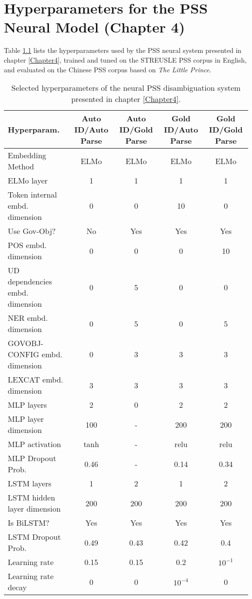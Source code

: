 
\chapter{Hyperparameters for the PSS Neural Model (Chapter 4)} %

\label{AppendixC} %

Table \ref{tab:hyperparamsC} lists the hyperparameters used by the
PSS neural system presented in chapter \ref{Chapter4}, trained and tuned on the STREUSLE PSS corpus in English, and evaluated on the Chinese PSS corpus based on \textit{The Little Prince}.

\begin{table}[]
  \small
	\centering
	\begin{tabular}{@{}l|cccc@{}}
		\toprule
		Hyperparam. & Auto ID/Auto Parse & Auto ID/Gold Parse & Gold ID/Auto Parse & Gold ID/Gold Parse\\
		\midrule
        Embedding Method & ELMo & ELMo & ELMo & ELMo \\
        ELMo layer & 1 & 1 & 1 & 1 \\
        Token internal embd. dimension & 0 & 0 & 10 & 0 \\
        Use Gov-Obj? & No & Yes & Yes & Yes \\
        POS embd. dimension  & 0 & 0 & 0 & 10 \\
        UD dependencies embd. dimension  & 0 & 5 & 0 & 0 \\
        NER  embd. dimension  & 0 & 5 & 0 & 5 \\
        GOVOBJ-CONFIG embd. dimension  & 0 & 3 & 3 & 3 \\
        LEXCAT embd. dimension  & 3 & 3 & 3 & 3 \\
        MLP layers  & 2 & 0 & 2 & 2 \\
        MLP layer dimension  & 100 & - & 200 & 200 \\
        MLP activation  & tanh & - & relu & relu \\
        MLP Dropout Prob.  & 0.46 & - & 0.14 & 0.34 \\
        LSTM layers  & 1 & 2 & 1 & 2 \\
        LSTM hidden layer dimension  & 200 & 200 & 200 & 200 \\
        Is BiLSTM? & Yes & Yes & Yes & Yes \\
        LSTM Dropout Prob.  & 0.49 & 0.43 & 0.42 & 0.4 \\
        Learning rate  & 0.15 & 0.15 & 0.2 & $10^{-1}$ \\
        Learning rate decay  & 0 & 0 & $10^{-4}$ & 0 \\
		\bottomrule
	\end{tabular}
	\caption{\label{tab:hyperparamsC}
        Selected hyperparameters of the neural PSS disambiguation system presented in chapter \ref{Chapter4}.
	}

\end{table}

